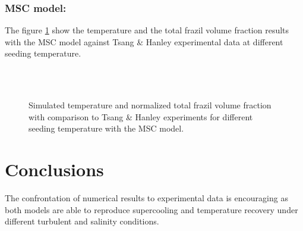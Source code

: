 \subsubsection{MSC model:}

The figure \ref{fig:tsang_multiclass}
show the temperature and the total frazil volume fraction results with the MSC 
model against Tsang \& Hanley experimental data at different seeding temperature.

\begin{figure}[H]
    \begin{center}
        \\
        \\
    \end{center}
    \caption{Simulated temperature and normalized total frazil volume fraction with comparison to Tsang \& Hanley experiments for different seeding temperature with the MSC model.}
    \label{fig:tsang_multiclass}
\end{figure}

\section{Conclusions}

The confrontation of numerical results to experimental data is 
encouraging as both models are able to reproduce supercooling and temperature recovery 
under different turbulent and salinity conditions.

\renewcommand{\labelitemi}{\textbullet}
